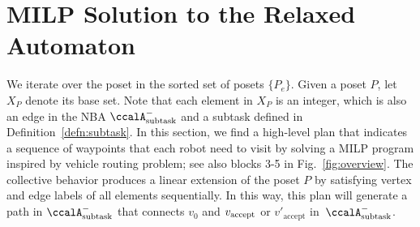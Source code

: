 \documentclass[Afour,sageh,times]{sagej}
\newtheorem{exmp}{Example}
\newcommand{\auto}[1]{\ccalA_{\textup{#1}}}
\newcommand{\vertex}[1]{v_{\textup{#1}}}
\newenvironment{cexmp}
{\addtocounter{exmp}{-1}\begin{exmp}}
  {\end{exmp}}
\begin{document}
\section{MILP Solution to the Relaxed Automaton}\label{sec:solution}
We iterate over the poset in the  sorted set of posets  $\{P_e\}$. Given a poset $P$, let $X_{P}$ denote its base set. Note that each element in $X_P$ is an integer, which is also an edge in the NBA $\auto{subtask}^-$ and a subtask defined in Definition~\ref{defn:subtask}. In this section, we find a high-level plan that indicates  a sequence of waypoints that each robot need to visit by solving a MILP program inspired by vehicle routing problem; see also blocks 3-5 in Fig.~\ref{fig:overview}. The collective behavior produces a linear extension of the poset $P$ by satisfying vertex and edge labels of all elements sequentially. In this way,  this plan will generate a path in $\auto{subtask}^-$ that connects $v_0$ and $\vertex{accept}$ or $v'_{\text{accept}}$ in~$\auto{subtask}^-$.
\end{document}
